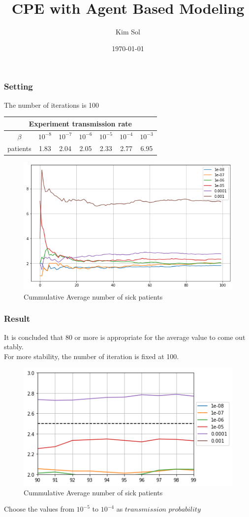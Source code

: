 \documentclass[aspectratio=169, 9pt, xcolor=table]{beamer}
\title{CPE with Agent Based Modeling}
\author{Kim Sol}
\institute{School of Mathematics and Computing}
\date{\today}
\begin{document}
\begin{frame}
    \titlepage
\end{frame}


\begin{frame}
    \frametitle{Setting}
    The number of iterations is 100
    \begin{center}
    \begin{tabular}{|c||c|c|c|c|c|c|}   
        \hline
        \multicolumn{7}{|c|}{Experiment transmission rate} \\
        \hline
        \(\beta\)& \(10^{-8}\) & \(10^{-7}\) & \(10^{-6}\) & \(10^{-5}\) & \(10^{-4}\) & \(10^{-3}\)\\
        \hline
        patients& 1.83  & 2.04 & 2.05 & 2.33 & 2.77 & 6.95\\
        \hline
    \end{tabular}
    \end{center}


    \begin{figure}[H]
        \centering
        \includegraphics[width=.5\textwidth]{../result/calibration/pic/[2022.8.17]CalibrateBeta4.eps.png} %
        \caption{Cummulative Average number of sick patients}
    \end{figure}
    
\end{frame}

\begin{frame}
    \frametitle{Result}
    It is concluded that 80 or more is appropriate for the average value to come out stably. \\
    For more stability, the number of iteration is fixed at 100.
    \begin{figure}[H]
        \centering
        \includegraphics[width=.5\textwidth]{../result/calibration/pic/[2022.8.17]CalibrateBeta4_zoom.eps.png} %
        \caption{Cummulative Average number of sick patients}
    \end{figure}
    Choose the values from \(10^{-5}\) to \(10^{-4}\) as $\textit{transmission probability}$
\end{frame}
\end{document}
